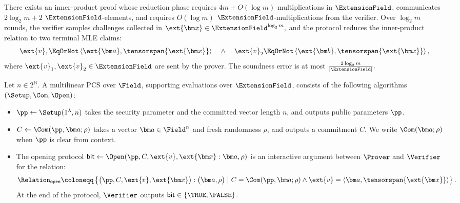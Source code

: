 \begin{fact}
\label{fact:ip}
There exists an inner-product proof whose reduction phase requires
\(4m+O(\log m)\) multiplications in \(\ExtensionField\), communicates
\(2\log_2 m+2\) $\ExtensionField$-elements, and requires
\(O(\log m)\) $\ExtensionField$-multiplications from the verifier.
Over \(\log_2 m\) rounds, the verifier samples challenges collected
in
\(
    \ext{\bm x}\in\ExtensionField^{\log_2 m},
\)
and the protocol reduces the inner-product relation to two
terminal MLE claims:
\[
    \ext{v}_1
    \EqOrNot
    \left\langle
        \ext{\bm a},
        \tensorspan{\ext{\bm x}}
    \right\rangle
    \quad\wedge\quad
    \ext{v}_2
    \EqOrNot
    \left\langle
        \ext{\bm b},
        \tensorspan{\ext{\bm x}}
    \right\rangle,
\]
where \(\ext{v}_1,\ext{v}_2\in\ExtensionField\) are sent by the
prover. The soundness error is at most
\(
    \frac{2\log_2 m}{\lvert\ExtensionField\rvert}.
\)
\end{fact}

\begin{definition}
\label{def:pcs}
Let \(n \in 2^\mathbb{N}\). A multilinear PCS over \(\Field\), supporting evaluations over
\(\ExtensionField\), consists of the following algorithms $(\Setup, \Com, \Open)$:
\begin{itemize}[leftmargin=*,labelsep=0.5em]
    \item
    \(
        \pp\leftarrow\Setup(1^\lambda,n)
    \)
    takes the security parameter and the committed vector length
    \(n\), and outputs public parameters \(\pp\).

    \item
    \(
        C\leftarrow\Com(\pp,\bm a;\rho)
    \)
    takes a vector \(\bm a\in\Field^n\) and fresh randomness
    \(\rho\), and outputs a commitment \(C\). We write
    \(\Com(\bm a;\rho)\) when \(\pp\) is clear from context.

    \item The opening protocol
    \(
        \mathsf{bit}
        \leftarrow
        \Open\!\left(
            \pp,C,\ext{v},\ext{\bm x}
            :
            \bm a,\rho
        \right)
    \)
    is an interactive argument between \(\Prover\) and
    \(\Verifier\) for the relation:
    \[
        \Relation_{\mathsf{open}}
        \coloneqq
        \left\{
            \bigl(
                \pp,C,\ext{v},\ext{\bm x}
            \bigr)
                :
            \bigl(
                \bm a,\rho
            \bigr)
            \;\middle|\;
            \begin{aligned}
                C=\Com(\pp,\bm a;\rho) \wedge
                \ext{v}=\left\langle
            \bm a,
            \tensorspan{\ext{\bm x}}
        \right\rangle
            \end{aligned}
        \right\}.
    \]
    At the end of the protocol, \(\Verifier\) outputs
    \(\mathsf{bit}\in\{\TRUE,\FALSE\}\).
\end{itemize}
\end{definition}



